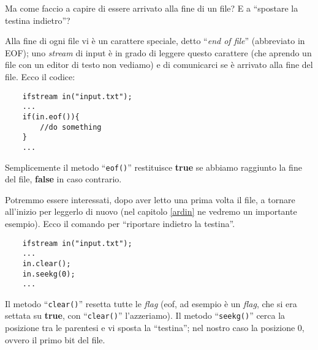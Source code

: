 Ma come faccio a capire di essere arrivato alla fine di un file? E a ``spostare la testina indietro''?

Alla fine di ogni file vi è un carattere speciale, detto ``\emph{end of file}'' (abbreviato in EOF); uno \emph{stream} di input è in grado di leggere questo carattere (che aprendo un file con un editor di testo non vediamo) e di comunicarci se è arrivato alla fine del file. Ecco il codice:
\begin{lstlisting}
	ifstream in("input.txt");
	...
	if(in.eof()){
		//do something
	}
	...
\end{lstlisting}

Semplicemente il metodo ``\verb|eof()|'' restituisce \textbf{true} se abbiamo raggiunto la fine del file, \textbf{false} in caso contrario.

Potremmo essere interessati, dopo aver letto una prima volta il file, a tornare all'inizio per leggerlo di nuovo (nel capitolo \ref{ardin} ne vedremo un importante esempio). Ecco il comando per ``riportare indietro la testina''. 
\begin{lstlisting}
	ifstream in("input.txt");
	...
	in.clear(); 
	in.seekg(0);
	...
\end{lstlisting}

Il metodo ``\verb|clear()|'' resetta tutte le \emph{flag} (eof, ad esempio è un \emph{flag}, che si era settata su \textbf{true}, con ``\verb|clear()|'' l'azzeriamo). Il metodo ``\verb|seekg()|'' cerca la posizione tra le parentesi e vi sposta la ``testina''; nel nostro caso la posizione 0, ovvero il primo bit del file.

